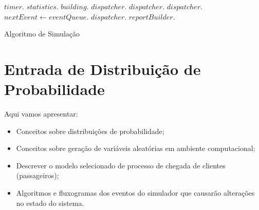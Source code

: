 \begin{algorithm}[H]
\begin{center}
\begin{algorithmic}[1]
  \State $timer.$
  \State $statistics.$
  \State $building.$
  \State $dispatcher.$
  \State $dispatcher.$
  \State $dispatcher.$
    \State $nextEvent \gets eventQueue.$
    \State $dispatcher.$
  \EndWhile
  \State $reportBuilder.$
\EndFunction
\end{algorithmic}
\end{center}
\caption
   {\label{alg:sim}Algoritmo de Simulação}
\end{algorithm}

\section{\label{chap:input}Entrada de Distribuição de Probabilidade}

Aqui vamos apresentar:

\begin{itemize}
\item Conceitos sobre distribuições de probabilidade;
\item Conceitos sobre geração de variáveis aleatórias em ambiente computacional;
\item Descrever o modelo selecionado de processo de chegada de clientes
(passageiros);
\item Algoritmos e fluxogramas dos eventos do simulador que causarão alterações
no estado do sistema.
\end{itemize}